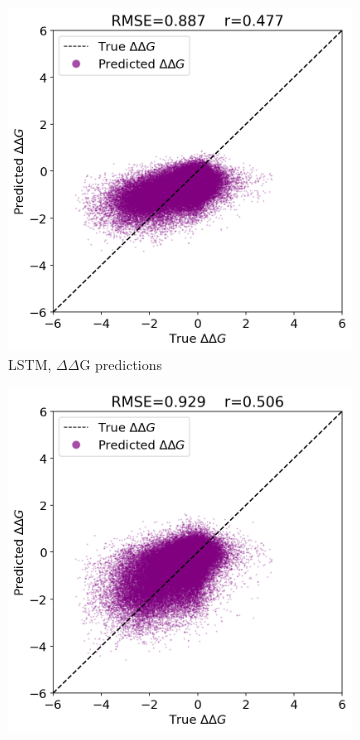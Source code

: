 \documentclass{article}
\newcommand{\dd}{$\Delta\Delta$}
\begin{document}
\begin{figure}[!htb]
    \centering
    \begin{subfigure}[b]{0.49\textwidth}
        \centering
        \includegraphics[width=\textwidth]{plots/lstm_error.png}
        \caption{LSTM, \dd G predictions}
        \label{fig:lstme}
    \end{subfigure}
    \hfill
    \begin{subfigure}[b]{0.49\textwidth}
        \centering
        \includegraphics[width=\textwidth]{plots/lstmanti_error.png}

\end{subfigure}
\end{figure}
\end{document}
